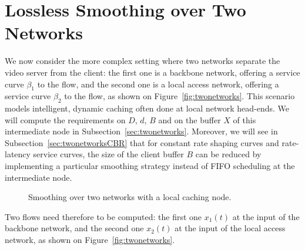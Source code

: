 

\section{Lossless Smoothing over Two Networks}

We now consider the more complex setting where two networks
separate the video server from the client: the first one is a backbone network, offering a service
curve $\beta_1$ to the flow, and the second one is a local access network, offering a service
curve $\beta_2$ to the flow, as shown on Figure~\ref{fig:twonetworks}.
This scenario models intelligent, dynamic caching often done at local network head-ends.
We will compute the requirements on $D$, $d$, $B$ and on the buffer $X$ of this
intermediate node in Subsection~\ref{sec:twonetworks}.
Moreover, we will see in Subsection~\ref{sec:twonetworksCBR} that for constant rate shaping curves and rate-latency
service curves, the size of the client buffer $B$ can be reduced by implementing a particular smoothing strategy instead of FIFO scheduling
at the intermediate node.


\begin{figure}[h!]
\caption{Smoothing over two networks with a local caching node.}
\end{figure}

Two flows need therefore to be computed:
the first one $x_1(t)$ at the input of the backbone network, and the second one $x_2(t)$ at the input of the
local access network, as shown on Figure~\ref{fig:twonetworks}.

